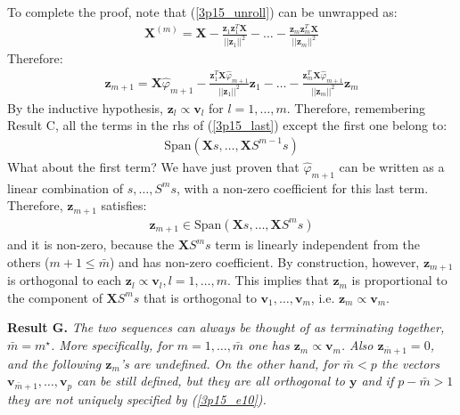 \begin{itemize}
    To complete the proof, note that (\ref{3p15_unroll}) can be unwrapped as:
    \begin{eqnarray*}
        \mathbf{X}^{(m)} = \mathbf{X} - \frac{ \mathbf{z}_1 \mathbf{z}_1^T \mathbf{X}}{||\mathbf{z}_1||^2} - \ldots  - \frac{ \mathbf{z}_m \mathbf{z}_m^T \mathbf{X}}{||\mathbf{z}_m||^2}
    \end{eqnarray*}
    Therefore:
    \begin{eqnarray} \label{3p15_last}
    \mathbf{z}_{m + 1} = \mathbf{X} \hat{\varphi}_{m + 1} - \frac{\mathbf{z}_1^T \mathbf{X} \hat{\varphi}_{m + 1}}{ || \mathbf{z}_1||^2} \mathbf{z}_1 - \ldots - 
    \frac{\mathbf{z}_m^T \mathbf{X} \hat{\varphi}_{m + 1}}{ || \mathbf{z}_m||^2} \mathbf{z}_m
    \end{eqnarray}
    By the inductive hypothesis, $\mathbf{z}_l \propto \mathbf{v}_l$ for $l = 1, \ldots, m$. 
    Therefore, remembering Result C, all the terms in the rhs of (\ref{3p15_last}) except the first one belong to:
    \begin{eqnarray*}
        \textrm{Span} \left( \mathbf{X}s, \ldots, \mathbf{X}S^{m - 1}s \right)
    \end{eqnarray*}
    What about the first term? We have just proven that $\hat{\varphi}_{m + 1}$ can be written as
    a linear combination of $s, \ldots, S^{m}s$, with a non-zero coefficient for this last term.
    Therefore, $\mathbf{z}_{m +1}$ satisfies:
    \begin{eqnarray*}
        \mathbf{z}_{m + 1} \in \textrm{Span} \left( \mathbf{X}s, \ldots, \mathbf{X}S^{m} s \right)
    \end{eqnarray*}
    and it is non-zero, because the $\mathbf{X}S^{m} s$ term is linearly independent from the 
    others ($m + 1 \leq \bar{m}$) and has non-zero coefficient. By construction, however, $\mathbf{z}_{m +1}$ is orthogonal to each $\mathbf{z}_l \propto \mathbf{v}_l, l = 1, \ldots, m$. This implies
    that $\mathbf{z}_m$ is proportional to the component of $\mathbf{X} S^{m} s$ that is orthogonal
    to $\mathbf{v}_1, \ldots, \mathbf{v}_m$, i.e. $\mathbf{z}_m \propto \mathbf{v}_m$.
\end{itemize}

\vspace{0.5cm}
\noindent \textbf{Result G.} \textit{ The two sequences can always be thought of as terminating together, $\bar{m} = m ^{\star}$. More specifically, for $m = 1, \ldots, \bar{m}$ one has $\mathbf{z}_m \propto \mathbf{v}_m$. Also $\mathbf{z}_{\bar{m} + 1} = 0$, and the following $\mathbf{z}_m$'s are undefined. On the other hand, for $\bar{m} < p$ the vectors $\mathbf{v}_{\bar{m} + 1}, \ldots, \mathbf{v}_{p}$ can be still defined, but they are all orthogonal to $\mathbf{y}$
    and if $p - \bar{m} > 1$ they are not uniquely specified by (\ref{3p15_e10}).}

